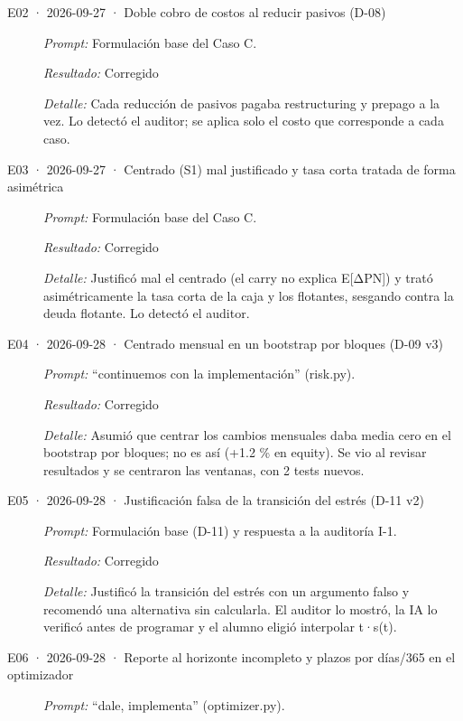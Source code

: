 \begin{description}
\item[E02 · 2026-09-27 · Doble cobro de costos al reducir pasivos (D-08)] \mbox{}\par
\textit{Prompt:} Formulación base del Caso C.\par
\textit{Resultado:} Corregido\par
\textit{Detalle:} Cada reducción de pasivos pagaba restructuring y prepago a la vez. Lo detectó el auditor; se aplica solo el costo que corresponde a cada caso.\par
\item[E03 · 2026-09-27 · Centrado (S1) mal justificado y tasa corta tratada de forma asimétrica] \mbox{}\par
\textit{Prompt:} Formulación base del Caso C.\par
\textit{Resultado:} Corregido\par
\textit{Detalle:} Justificó mal el centrado (el carry no explica E[ΔPN]) y trató asimétricamente la tasa corta de la caja y los flotantes, sesgando contra la deuda flotante. Lo detectó el auditor.\par
\item[E04 · 2026-09-28 · Centrado mensual en un bootstrap por bloques (D-09 v3)] \mbox{}\par
\textit{Prompt:} \enquote{continuemos con la implementación} (risk.py).\par
\textit{Resultado:} Corregido\par
\textit{Detalle:} Asumió que centrar los cambios mensuales daba media cero en el bootstrap por bloques; no es así (+1.2 \% en equity). Se vio al revisar resultados y se centraron las ventanas, con 2 tests nuevos.\par
\item[E05 · 2026-09-28 · Justificación falsa de la transición del estrés (D-11 v2)] \mbox{}\par
\textit{Prompt:} Formulación base (D-11) y respuesta a la auditoría I-1.\par
\textit{Resultado:} Corregido\par
\textit{Detalle:} Justificó la transición del estrés con un argumento falso y recomendó una alternativa sin calcularla. El auditor lo mostró, la IA lo verificó antes de programar y el alumno eligió interpolar t·s(t).\par
\item[E06 · 2026-09-28 · Reporte al horizonte incompleto y plazos por días/365 en el optimizador] \mbox{}\par
\textit{Prompt:} \enquote{dale, implementa} (optimizer.py).\par

\end{description}
